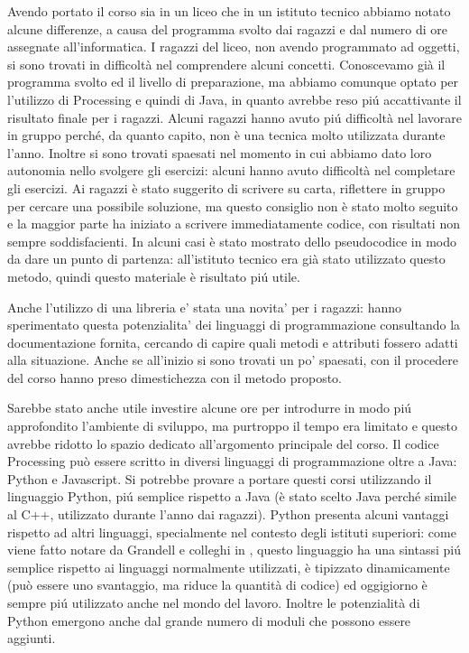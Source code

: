 Avendo portato il corso sia in un liceo che in un istituto tecnico abbiamo notato alcune differenze, a causa del programma svolto dai ragazzi e dal numero di ore assegnate all'informatica. I ragazzi del liceo, non avendo programmato ad oggetti, si sono trovati in difficoltà nel comprendere alcuni concetti. Conoscevamo già il programma svolto ed il livello di preparazione, ma abbiamo comunque optato per l'utilizzo di Processing e quindi di Java, in quanto avrebbe reso piú accattivante il risultato finale per i ragazzi. Alcuni ragazzi hanno avuto piú difficoltà nel lavorare in gruppo perché, da quanto capito, non è una tecnica molto utilizzata durante l'anno. Inoltre si sono trovati spaesati nel momento in cui abbiamo dato loro autonomia nello svolgere gli esercizi: alcuni hanno avuto difficoltà nel completare gli esercizi. Ai ragazzi è stato suggerito di scrivere su carta, riflettere in gruppo per cercare una possibile soluzione, ma questo consiglio non è stato molto seguito e la maggior parte ha iniziato a scrivere immediatamente codice, con risultati non sempre soddisfacienti. In alcuni casi è stato mostrato dello pseudocodice in modo da dare un punto di partenza: all'istituto tecnico era già stato utilizzato questo metodo, quindi questo materiale è risultato piú utile.

Anche l'utilizzo di una libreria e' stata una novita' per i ragazzi: hanno sperimentato questa potenzialita' dei linguaggi di programmazione consultando la documentazione fornita, cercando di capire quali metodi e attributi fossero adatti alla situazione. Anche se all'inizio si sono trovati un po' spaesati, con il procedere del corso hanno preso dimestichezza con il metodo proposto.

Sarebbe stato anche utile investire alcune ore per introdurre in modo piú approfondito l'ambiente di sviluppo, ma purtroppo il tempo era limitato e questo avrebbe ridotto lo spazio dedicato all'argomento principale del corso. Il codice Processing può essere scritto in diversi linguaggi di programmazione oltre a Java: Python e Javascript. Si potrebbe provare a portare questi corsi utilizzando il linguaggio Python, piú semplice rispetto a Java (è stato scelto Java perché simile al C++, utilizzato durante l'anno dai ragazzi). Python presenta alcuni vantaggi rispetto ad altri linguaggi, specialmente nel contesto degli istituti superiori: come viene fatto notare da Grandell e colleghi in \cite{python_high_school}, questo linguaggio ha una sintassi piú semplice rispetto ai linguaggi normalmente utilizzati, è tipizzato dinamicamente (può essere uno svantaggio, ma riduce la quantità di codice) ed oggigiorno è sempre piú utilizzato anche nel mondo del lavoro. Inoltre le potenzialità di Python emergono anche dal grande numero di moduli che possono essere aggiunti. 

